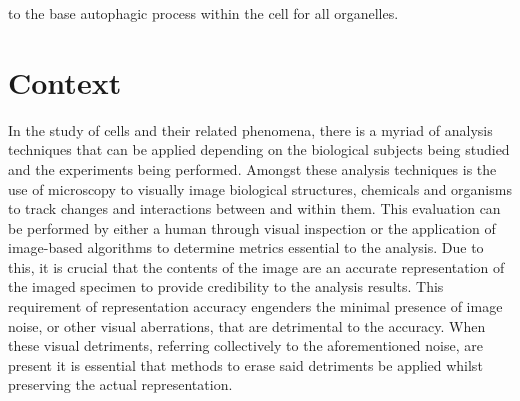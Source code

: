 to the base autophagic process within the cell for all organelles.\cite{MitoMechan}      


\section{Context}\label{sec:Context}
In the study of cells and their related phenomena, there is a myriad of analysis techniques that can be applied depending on the biological subjects being studied and the experiments being performed. Amongst these analysis techniques is the use of microscopy to visually image biological structures, chemicals and organisms to track changes and interactions between and within them. This evaluation can be performed by either a human through visual inspection or the application of image-based algorithms to determine metrics essential to the analysis. Due to this, it is crucial that the contents of the image are an accurate representation of the imaged specimen to provide credibility to the analysis results. This requirement of representation accuracy engenders the minimal presence of image noise, or other visual aberrations, that are detrimental to the accuracy. When these visual detriments, referring collectively to the aforementioned noise, are present it is essential that methods to erase said detriments be applied whilst preserving the actual representation.

